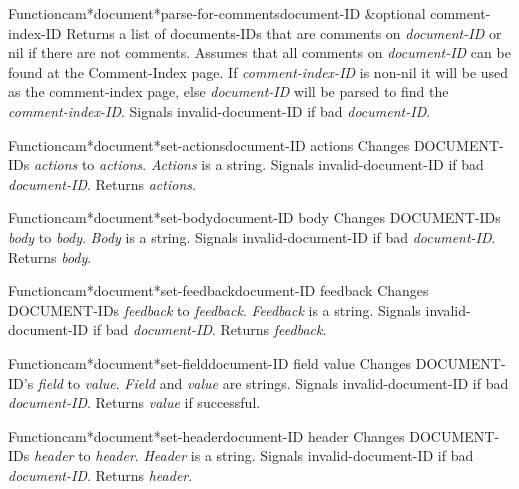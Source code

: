 \begin{functiondoc}{Function}{cam*document*parse-for-comments}{document-ID \&optional comment-index-ID}
Returns a list of documents-IDs that are comments on
{\em document-ID} or nil if there are not comments.
Assumes that all comments on {\em document-ID} can be found at the Comment-Index page.
If {\em comment-index-ID} is non-nil it will be used as the comment-index page, else
 {\em document-ID} will be parsed to find the {\em comment-index-ID}.
Signals invalid-document-ID if bad {\em document-ID}.
\end{functiondoc}

\begin{functiondoc}{Function}{cam*document*set-actions}{document-ID actions}
Changes DOCUMENT-IDs {\em actions} to {\em actions}.
{\em Actions} is a string.
Signals invalid-document-ID if bad {\em document-ID}.
Returns {\em actions}.
\end{functiondoc}

\begin{functiondoc}{Function}{cam*document*set-body}{document-ID body}
Changes DOCUMENT-IDs {\em body} to {\em body}.
{\em Body} is a string.
Signals invalid-document-ID if bad {\em document-ID}.
Returns {\em body}.
\end{functiondoc}

\begin{functiondoc}{Function}{cam*document*set-feedback}{document-ID feedback}
Changes DOCUMENT-IDs {\em feedback} to {\em feedback}.
{\em Feedback} is a string.
Signals invalid-document-ID if bad {\em document-ID}.
Returns {\em feedback}.
\end{functiondoc}

\begin{functiondoc}{Function}{cam*document*set-field}{document-ID field value}
Changes DOCUMENT-ID's {\em field} to {\em value}.
{\em Field} and {\em value} are strings.
Signals invalid-document-ID if bad {\em document-ID}.
Returns {\em value} if successful.
\end{functiondoc}

\begin{functiondoc}{Function}{cam*document*set-header}{document-ID header}
Changes DOCUMENT-IDs {\em header} to {\em header}.
{\em Header} is a string.
Signals invalid-document-ID if bad {\em document-ID}.
Returns {\em header}.
\end{functiondoc}


